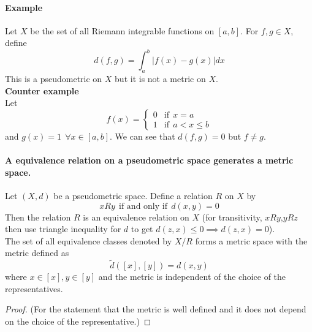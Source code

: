 \documentclass[12pt]{report}
\begin{document}
\paragraph*{Example}
Let $X$ be the set of all Riemann integrable functions on $[a,b]$. For $f,g \in X$, define
$$ d(f,g) = \int_a^b |f(x) - g(x)| dx$$
This is a pseudometric on $X$ but it is not a metric on $X$.\\
\textbf{Counter example}\\
Let
$$ 
f(x) = \begin{cases}
        0 & \text{if}~~x=a\\
        1 & \text{if}~~a < x \leq b
    \end{cases}
$$
and $g(x) = 1~~\forall x \in [a,b]$. We can see that $d(f,g) = 0$ but $f \neq g$.
\paragraph*{A equivalence relation on a pseudometric space generates a metric space. } Let $(X,d)$ be a pseudometric space. Define a relation $R$ on $X$ by 
$$ xRy~~\text{if and only if}~~ d(x,y) = 0$$
Then the relation $R$ is an equivalence relation on $X$ (for transitivity, $xRy$,$yRz$ then use triangle inequality for $d$ to get $d(z,x) \leq 0 \implies d(z,x) = 0$).\\
The set of all equivalence classes denoted by $X/R$ forms a metric space with the metric defined as
$$ \tilde{d}([x],[y]) = d(x,y)$$
where $x \in [x],y \in [y]$ and the metric is independent of the choice of the representatives.
\begin{proof}
    (For the statement that the metric is well defined and it does not depend on the choice of the representative.)
\end{proof}
\end{document}
